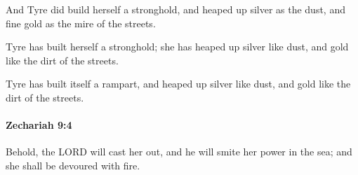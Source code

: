 			\begin{versebox}
					\item[BHS] 
					\item[LXX] 
					\item[ASV] And Tyre did build herself a stronghold, and heaped up silver as the dust, and fine gold as the mire of the streets.
					\item[NIV] Tyre has built herself a stronghold; she has heaped up silver like dust, and gold like the dirt of the streets.
					\item[NRSV] Tyre has built itself a rampart, and heaped up silver like dust, and gold like the dirt of the streets.
			\end{versebox}

		\paragraph{Zechariah 9:4} %
			\label{ZECHARIAH-9-4}

			Behold, the LORD will cast her out, and he will smite her power in the sea; and she shall be devoured with fire.

